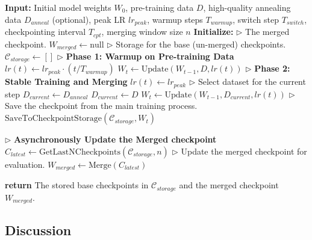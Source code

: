         
\begin{algorithm}[H] %
\small
\caption{The WSM LRS Pre-training Pipeline}
\label{alg:WSM-anneal}
\begin{algorithmic}
\State \textbf{Input:} Initial model weights $W_0$, pre-training data $D$, high-quality annealing data $D_{anneal}$ (optional), peak LR $lr_{peak}$, warmup steps $T_{warmup}$, switch step $T_{switch}$, checkpointing interval $T_{cpt}$, merging window size $n$
\Statex %
\State \textbf{Initialize:}
\State $\triangleright$ The merged checkpoint.
\State $W_{merged} \gets \text{null}$ 
\State $\triangleright$ Storage for the base (un-merged) checkpoints.
\State $\mathcal{C}_{storage} \gets []$ 
\Statex
\State $\triangleright$ \textbf{Phase 1: Warmup on Pre-training Data}
    \State $lr(t) \gets lr_{peak} \cdot (t / T_{warmup})$
    \State $W_t \gets \text{Update}(W_{t-1}, D, lr(t))$
\EndFor
\Statex
\State $\triangleright$ \textbf{Phase 2: Stable Training and Merging}
    \State $lr(t) \gets lr_{peak}$
    \State $\triangleright$ Select dataset for the current step
        \State $D_{current} \gets D_{anneal}$
    \Else
        \State $D_{current} \gets D$
    \EndIf
    \State $W_t \gets \text{Update}(W_{t-1}, D_{current}, lr(t))$
        \State $\triangleright$ Save the checkpoint from the main training process.
        \State $\text{SaveToCheckpointStorage}(\mathcal{C}_{storage}, W_t)$
        
        \State $\triangleright$ \textbf{Asynchronously Update the Merged checkpoint}
        \State $C_{latest} \gets \text{GetLastNCheckpoints}(\mathcal{C}_{storage}, n)$
            \State  $\triangleright$ Update the merged checkpoint for evaluation.
            \State $W_{merged} \gets \text{Merge}(C_{latest})$ 
        \EndIf
    \EndIf
\EndFor

\State \textbf{return} The stored base checkpoints in $\mathcal{C}_{storage}$ and the merged checkpoint $W_{merged}$.
\end{algorithmic}
\end{algorithm}
\subsection{Discussion}

